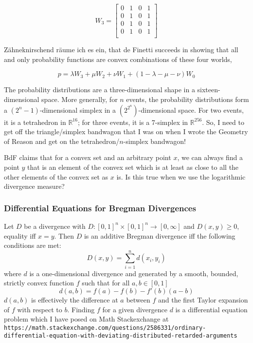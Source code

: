 \documentclass[12pt]{article}
\begin{document}
\begin{equation}
  \label{eq:kohzahsi}
  W_{3}=\left[
    \begin{array}{cccc}
      0 & 1 & 0 & 1 \\
      0 & 1 & 0 & 1 \\
      0 & 1 & 0 & 1 \\
      0 & 1 & 0 & 1 \\
    \end{array}\right]
\end{equation}

Z{\"a}hneknirschend r{\"a}ume ich es ein, that de Finetti succeeds in
showing that all and only probability functions are convex
combinations of these four worlds,

\begin{equation}
  \label{eq:yiehieli}
  p=\lambda{}W_{3}+\mu{}W_{2}+\nu{}W_{1}+(1-\lambda-\mu-\nu)W_{0}
\end{equation}

The probability distributions are a three-dimensional shape in a
sixteen-dimensional space. More generally, for $n$ events, the
probability distributions form a $(2^{n}-1)$-dimensional simplex in a
$(2^{2^{n}})$-dimensional space. For two events, it is a tetrahedron in
$\mathbb{R}^{16}$; for three events, it is a 7-simplex in
$\mathbb{R}^{256}$. So, I need to get off the triangle/simplex
bandwagon that I was on when I wrote the Geometry of Reason and get on
the tetrahedron/$n$-simplex bandwagon!

BdF claims that for a convex set and an arbitrary point $x$, we can always
find a point $y$ that is an element of the convex set which is at least as
close to all the other elements of the convex set as $x$ is. Is this
true when we use the logarithmic divergence measure?

\subsubsection{Differential Equations for Bregman Divergences}
\label{subsubsection:suthahco}

Let $D$ be a divergence with
$D:[0,1]^{n}\times[0,1]^{n}\rightarrow[0,\infty]$ and $D(x,y)\geq{}0$,
equality iff $x=y$. Then $D$ is an additive Bregman divergence iff the
following conditions are met:
\begin{equation}
  \label{eq:oengaegh}
  D(x,y)=\sum_{i=1}^{n}d(x_{i},y_{i})
\end{equation}
where $d$ is a one-dimensional divergence and generated by a smooth,
bounded, strictly convex function $f$ such that for all $a,b\in[0,1]$
\begin{equation}
  \label{eq:thohauma}
  d(a,b)=f(a)-f(b)-f'(b)(a-b)
\end{equation}
$d(a,b)$ is effectively the difference at $a$ between $f$ and the
first Taylor expansion of $f$ with respect to $b$. Finding $f$ for a
given divergence $d$ is a differential equation problem which I have
posed on Math Stackexchange at \texttt{https://math.stackexchange.com/questions/2586331/ordinary-}
\newline
\texttt{differential-equation-with-deviating-distributed-retarded-arguments}
\end{document}
